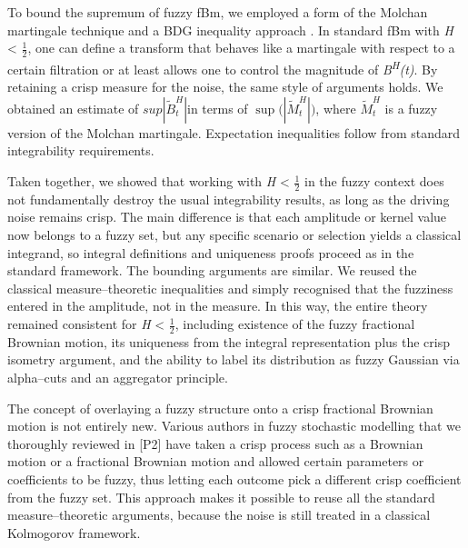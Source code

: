 \documentclass[12pt,a4paper]{report}
\numberwithin{equation}{section}
\begin{document}
To bound the supremum of fuzzy fBm, we employed a form of the Molchan
martingale technique and a BDG inequality approach \cite{dl1979extrapolation_85}. In standard
fBm with \emph{H} \textless{} $\frac{1}{2}$, one can define a transform that behaves
like a martingale with respect to a certain filtration or at least
allows one to control the magnitude of \emph{B\textsuperscript{H}(t)}.
By retaining a crisp measure for the noise, the same style of arguments
holds. We obtained an estimate of \(sup|{\widetilde{B}}_{t}^{H}|\)in
terms of \(\sup{(\left| {\widetilde{M}}_{t}^{H} \right|})\), where
\({\widetilde{M}}_{t}^{H}\) is a fuzzy version of the Molchan
martingale. Expectation inequalities follow from standard integrability
requirements.

Taken together, we showed that working with \emph{H} \textless{} $\frac{1}{2}$ in
the fuzzy context does not fundamentally destroy the usual integrability
results, as long as the driving noise remains crisp. The main difference
is that each amplitude or kernel value now belongs to a fuzzy set, but
any specific scenario or selection yields a classical integrand, so
integral definitions and uniqueness proofs proceed as in the standard
framework. The bounding arguments are similar. We reused the classical
measure--theoretic inequalities and simply recognised that the fuzziness
entered in the amplitude, not in the measure. In this way, the entire
theory remained consistent for \emph{H} \textless{} $\frac{1}{2}$, including
existence of the fuzzy fractional Brownian motion, its uniqueness from
the integral representation plus the crisp isometry argument, and the
ability to label its distribution as fuzzy Gaussian via alpha--cuts and
an aggregator principle.

The concept of overlaying a fuzzy structure onto a crisp fractional
Brownian motion is not entirely new. Various authors in fuzzy stochastic
modelling that we thoroughly reviewed in [P2] have taken a crisp
process such as a Brownian motion or a fractional Brownian motion and
allowed certain parameters or coefficients to be fuzzy, thus letting
each outcome pick a different crisp coefficient from the fuzzy set. This
approach makes it possible to reuse all the standard measure--theoretic
arguments, because the noise is still treated in a classical Kolmogorov
framework.
\end{document}
